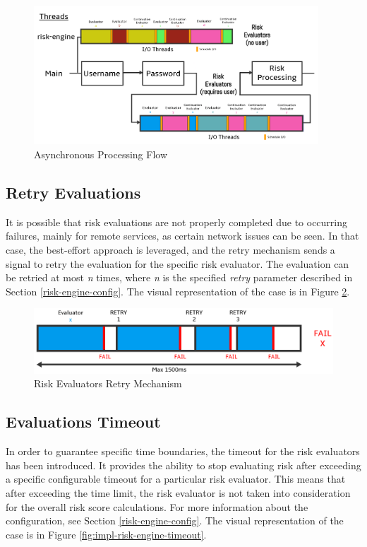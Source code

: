 \begin{figure}[htbp]
  \centering
  \includegraphics[width=0.95\textwidth]{img/sections/6-implementation/async-flow-final.png}
  \caption{Asynchronous Processing Flow}
  \label{fig:impl-risk-engine-flow}
\end{figure}

\newpage

\subsection{Retry Evaluations} \label{impl-engine-retry}
It is possible that risk evaluations are not properly completed due to occurring failures, mainly for remote services, as certain network issues can be seen.
In that case, the best-effort approach is leveraged, and the retry mechanism sends a signal to retry the evaluation for the specific risk evaluator.
The evaluation can be retried at most \textit{n} times, where \textit{n} is the specified \textit{retry} parameter described in Section \ref{risk-engine-config}.
The visual representation of the case is in Figure \ref{fig:impl-risk-engine-retry}.

\begin{figure}[htbp]
  \centering
  \includegraphics[width=1\textwidth]{img/sections/6-implementation/async-retry.png}
  \caption{Risk Evaluators Retry Mechanism}
  \label{fig:impl-risk-engine-retry}
\end{figure}

\subsection{Evaluations Timeout} \label{impl-engine-timeout}
In order to guarantee specific time boundaries, the timeout for the risk evaluators has been introduced.
It provides the ability to stop evaluating risk after exceeding a specific configurable timeout for a particular risk evaluator.
This means that after exceeding the time limit, the risk evaluator is not taken into consideration for the overall risk score calculations.
For more information about the configuration, see Section \ref{risk-engine-config}.
The visual representation of the case is in Figure \ref{fig:impl-risk-engine-timeout}.

